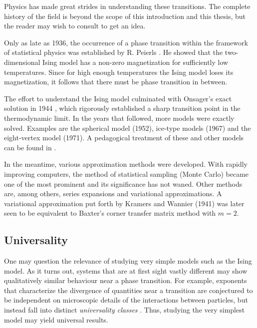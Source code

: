 Physics has made great strides in understanding these transitions. The
complete history of the field is beyond the scope of this introduction and this
thesis, but the reader may wish to consult \cite{kadanoff2009more,
domb1996critical} to get an idea.

Only as late as 1936, the occurrence of a phase transition
within the framework of statistical physics was established by R. Peierls
\cite{peierls1936on_ising}. He showed that the two-dimensional Ising model
has a non-zero magnetization for sufficiently low temperatures. Since for
high enough temperatures the Ising model loses its magnetization, it
follows that there must be phase transition in between.

The effort to understand the Ising model culminated with Onsager's exact solution in 1944
\cite{onsager1944two_dimensional}, which rigorously established a sharp transition point in the thermodynamic limit.
In the years that followed, more models were exactly solved.
Examples are the spherical model \cite{berlin1952spherical} (1952),
ice-type models \cite{sutherland1967exact} (1967) and the eight-vertex model \cite{baxter1971eight-vertex} (1971).
A pedagogical treatment of these and other models can be found in \cite{baxter1982exactly}.

In the meantime, various approximation methods were developed.
With rapidly improving computers, the method of statistical sampling (Monte Carlo) became one of the most prominent and
its significance has not waned.
Other methods are, among others, series expansions and variational approximations.
A variational approximation put forth by Kramers and Wannier (1941) \cite{kramers1941statistics} was later seen to be
equivalent to Baxter's corner transfer matrix method with $m = 2$.

\subsection{Universality}
One may question the relevance of studying very simple models such as the
Ising model. As it turns out, systems that are at first sight vastly
different may show qualitatively similar behaviour near a phase
transition. For example, exponents that characterize the divergence of
quantities near a transition are conjectured to be independent on
microscopic details of the interactions between particles, but instead
fall into distinct \emph{universality classes}
\cite{griffiths1970dependence, fisher1966quantum}. Thus, studying the very
simplest model may yield universal results.

